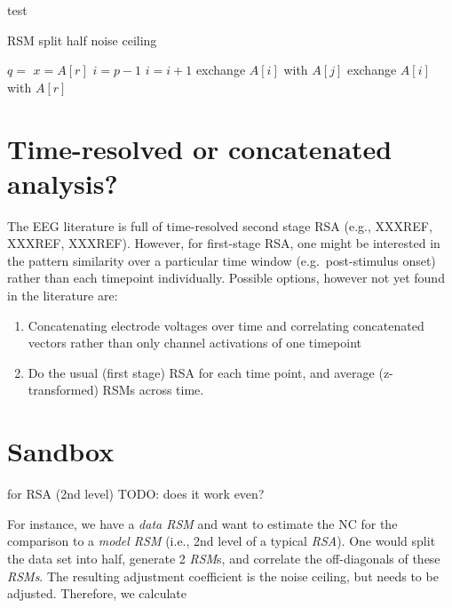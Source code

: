 \documentclass[
  letterpaper,
  DIV=11,
  numbers=noendperiod]{scrartcl}
\providecommand{\tightlist}{%
  \setlength{\itemsep}{0pt}\setlength{\parskip}{0pt}}\usepackage{longtable,booktabs,array}
\begin{document}
test

\begin{algorithm}[htb!]
\caption{RSM split half noise ceiling}
\label{alg-quicksort}
\begin{algorithmic}[1]
    \State $q = $ 
    \State {}
    \State {}
  \EndIf
\EndProcedure
{}
  \State $x = A[r]$
  \State $i = p - 1$
      \State $i = i + 1$
      \State exchange
      $A[i]$ with     $A[j]$
    \EndIf
    \State exchange $A[i]$ with $A[r]$
  \EndFor
\EndProcedure
\end{algorithmic}
\end{algorithm}

\hypertarget{sec-tr}{%
\section{Time-resolved or concatenated analysis?}\label{sec-tr}}

The EEG literature is full of time-resolved second stage RSA (e.g.,
XXXREF, XXXREF, XXXREF). However, for first-stage RSA, one might be
interested in the pattern similarity over a particular time window
(e.g.~post-stimulus onset) rather than each timepoint individually.
Possible options, however not yet found in the literature are:

\begin{enumerate}
\def\labelenumi{\arabic{enumi}.}
\tightlist
\item
  Concatenating electrode voltages over time and correlating
  concatenated vectors rather than only channel activations of one
  timepoint
\item
  Do the usual (first stage) RSA for each time point, and average
  (z-transformed) RSMs across time.
\end{enumerate}

\hypertarget{sandbox}{%
\section{Sandbox}\label{sandbox}}

for RSA (2nd level) TODO: does it work even?

For instance, we have a \emph{data RSM} and want to estimate the NC for
the comparison to a \emph{model RSM} (i.e., 2nd level of a typical
\emph{RSA}). One would split the data set into half, generate 2
\emph{RSM}s, and correlate the off-diagonals of these \emph{RSMs}. The
resulting adjustment coefficient is the noise ceiling, but needs to be
adjusted. Therefore, we calculate
\end{document}
